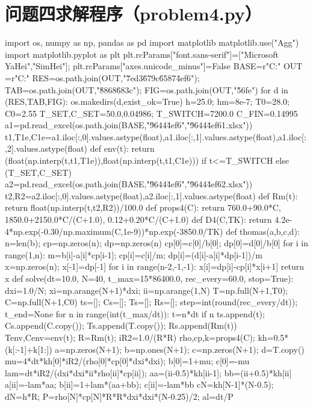 \section{问题四求解程序（problem4.py）}
\begin{codelisting}
import os, numpy as np, pandas as pd
import matplotlib
matplotlib.use("Agg")
import matplotlib.pyplot as plt
plt.rcParams["font.sans-serif"]=["Microsoft YaHei","SimHei"]; plt.rcParams["axes.unicode_minus"]=False
BASE=r"C:\Users{}\Desktop{}"
OUT =r"C:\Users{}\Desktop\A"
RES=os.path.join(OUT,"\u7ed3\u679c\u6587\u4ef6"); TAB=os.path.join(OUT,"\u8868\u683c"); FIG=os.path.join(OUT,"\u56fe")
for d in (RES,TAB,FIG): os.makedirs(d,exist_ok=True)
h=25.0; hm=8e-7; T0=28.0; C0=2.55
T_SET,C_SET=50.0,0.04986; T_SWITCH=7200.0
C_FIN=0.14995
a1=pd.read_excel(os.path.join(BASE,"\u9644\u4ef6","\u9644\u4ef61.xlsx"))
t1,T1e,C1e=a1.iloc[:,0].values.astype(float),a1.iloc[:,1].values.astype(float),a1.iloc[:,2].values.astype(float)
def env(t):
    return (float(np.interp(t,t1,T1e)),float(np.interp(t,t1,C1e))) if t<=T_SWITCH else (T_SET,C_SET)
a2=pd.read_excel(os.path.join(BASE,"\u9644\u4ef6","\u9644\u4ef62.xlsx"))
t2,R2=a2.iloc[:,0].values.astype(float),a2.iloc[:,1].values.astype(float)
def Rm(t):
    return float(np.interp(t,t2,R2))/100.0
def props4(C):
    return 760.0+90.0*C, 1850.0+2150.0*C/(C+1.0), 0.12+0.20*C/(C+1.0)
def D4(C,TK):
    return 4.2e-4*np.exp(-0.30/np.maximum(C,1e-9))*np.exp(-3850.0/TK)
def thomas(a,b,c,d):
    n=len(b); cp=np.zeros(n); dp=np.zeros(n)
    cp[0]=c[0]/b[0]; dp[0]=d[0]/b[0]
    for i in range(1,n):
        m=b[i]-a[i]*cp[i-1]; cp[i]=c[i]/m; dp[i]=(d[i]-a[i]*dp[i-1])/m
    x=np.zeros(n); x[-1]=dp[-1]
    for i in range(n-2,-1,-1): x[i]=dp[i]-cp[i]*x[i+1]
    return x
def solve(dt=10.0, N=40, t_max=15*86400.0, rec_every=60.0, stop=True):
    dxi=1.0/N; xi=np.arange(N+1)*dxi; ii=np.arange(1,N)
    T=np.full(N+1,T0); C=np.full(N+1,C0)
    ts=[]; Cs=[]; Ts=[]; Rs=[]; step=int(round(rec_every/dt)); t_end=None
    for n in range(int(t_max/dt)):
        t=n*dt
        if n%
            ts.append(t); Cs.append(C.copy()); Ts.append(T.copy()); Rs.append(Rm(t))
        Tenv,Cenv=env(t); R=Rm(t); iR2=1.0/(R*R)
        rho,cp,k=props4(C); kh=0.5*(k[:-1]+k[1:])
        a=np.zeros(N+1); b=np.ones(N+1); c=np.zeros(N+1); d=T.copy()
        mu=4*dt*kh[0]*iR2/(rho[0]*cp[0]*dxi*dxi); b[0]=1+mu; c[0]=-mu
        lam=dt*iR2/(dxi*dxi*ii*rho[ii]*cp[ii]); aa=(ii-0.5)*kh[ii-1]; bb=(ii+0.5)*kh[ii]
        a[ii]=-lam*aa; b[ii]=1+lam*(aa+bb); c[ii]=-lam*bb
        cN=kh[N-1]*(N-0.5); dN=h*R; P=rho[N]*cp[N]*R*R*dxi*dxi*(N-0.25)/2; al=dt/P

\end{codelisting}
